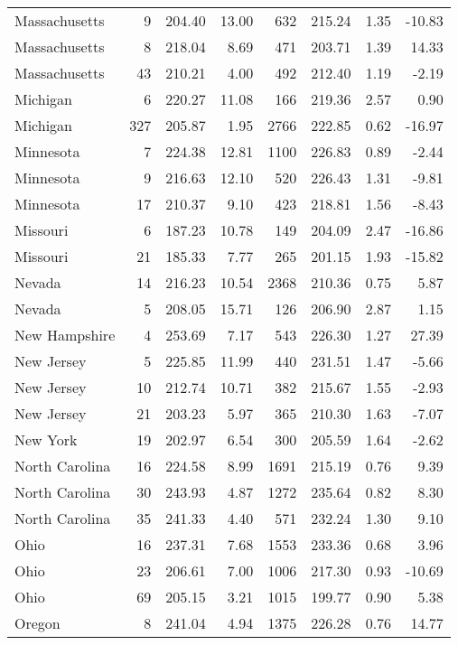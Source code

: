 \begin{longtable}{lrrr@{\extracolsep{10pt}}rrrr}
  Massachusetts &   9 & 204.40 & 13.00 & 632 & 215.24 & 1.35 & -10.83 \\ 
  Massachusetts &   8 & 218.04 & 8.69 & 471 & 203.71 & 1.39 & 14.33 \\ 
  Massachusetts &  43 & 210.21 & 4.00 & 492 & 212.40 & 1.19 & -2.19 \\ 
  Michigan &   6 & 220.27 & 11.08 & 166 & 219.36 & 2.57 & 0.90 \\ 
  Michigan & 327 & 205.87 & 1.95 & 2766 & 222.85 & 0.62 & -16.97 \\ 
  Minnesota &   7 & 224.38 & 12.81 & 1100 & 226.83 & 0.89 & -2.44 \\ 
  Minnesota &   9 & 216.63 & 12.10 & 520 & 226.43 & 1.31 & -9.81 \\ 
  Minnesota &  17 & 210.37 & 9.10 & 423 & 218.81 & 1.56 & -8.43 \\ 
  Missouri &   6 & 187.23 & 10.78 & 149 & 204.09 & 2.47 & -16.86 \\ 
  Missouri &  21 & 185.33 & 7.77 & 265 & 201.15 & 1.93 & -15.82 \\ 
  Nevada &  14 & 216.23 & 10.54 & 2368 & 210.36 & 0.75 & 5.87 \\ 
  Nevada &   5 & 208.05 & 15.71 & 126 & 206.90 & 2.87 & 1.15 \\ 
  New Hampshire &   4 & 253.69 & 7.17 & 543 & 226.30 & 1.27 & 27.39 \\ 
  New Jersey &   5 & 225.85 & 11.99 & 440 & 231.51 & 1.47 & -5.66 \\ 
  New Jersey &  10 & 212.74 & 10.71 & 382 & 215.67 & 1.55 & -2.93 \\ 
  New Jersey &  21 & 203.23 & 5.97 & 365 & 210.30 & 1.63 & -7.07 \\ 
  New York &  19 & 202.97 & 6.54 & 300 & 205.59 & 1.64 & -2.62 \\ 
  North Carolina &  16 & 224.58 & 8.99 & 1691 & 215.19 & 0.76 & 9.39 \\ 
  North Carolina &  30 & 243.93 & 4.87 & 1272 & 235.64 & 0.82 & 8.30 \\ 
  North Carolina &  35 & 241.33 & 4.40 & 571 & 232.24 & 1.30 & 9.10 \\ 
  Ohio &  16 & 237.31 & 7.68 & 1553 & 233.36 & 0.68 & 3.96 \\ 
  Ohio &  23 & 206.61 & 7.00 & 1006 & 217.30 & 0.93 & -10.69 \\ 
  Ohio &  69 & 205.15 & 3.21 & 1015 & 199.77 & 0.90 & 5.38 \\ 
  Oregon &   8 & 241.04 & 4.94 & 1375 & 226.28 & 0.76 & 14.77 \\ 

\end{longtable}
